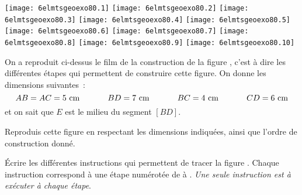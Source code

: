 \begin{center}
  \texttt{[image: 6elmtsgeoexo80.1]}
  \texttt{[image: 6elmtsgeoexo80.2]}
  \texttt{[image: 6elmtsgeoexo80.3]}
  \texttt{[image: 6elmtsgeoexo80.4]}
  \texttt{[image: 6elmtsgeoexo80.5]}\\
  \texttt{[image: 6elmtsgeoexo80.6]}
  \texttt{[image: 6elmtsgeoexo80.7]}
  \texttt{[image: 6elmtsgeoexo80.8]}
  \texttt{[image: 6elmtsgeoexo80.9]}
  \texttt{[image: 6elmtsgeoexo80.10]}
\end{center}
On a reproduit ci-dessus le film de la construction de la figure
, c'est à dire les différentes étapes qui permettent de
construire cette figure. On donne les dimensions suivantes :
\[AB=AC=5~\mbox{cm}\kern0.1\linewidth BD=7~\mbox{cm}\kern0.1\linewidth
BC=4~\mbox{cm}\kern0.1\linewidth CD=6~\mbox{cm}\]
et on sait que $E$ est le milieu du segment $[BD]$.
\begin{myenumerate}
  \item Reproduis cette figure en respectant les dimensions indiquées, ainsi que l'ordre de construction donné.
  \item \'Ecrire les différentes instructions qui permettent de tracer
    la figure . Chaque instruction correspond à une étape
    numérotée de  à . {\em Une seule instruction est à exécuter à chaque étape}.
\end{myenumerate}